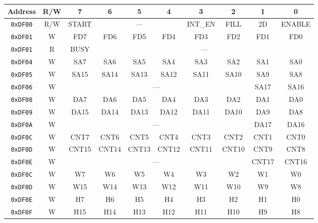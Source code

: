 \begin{table}[h]
    \begin{center}
        \begin{tabular}{|c|c|c|c|c|c|c|c|c|c|} \hline
            Address & R/W & 7 & 6 & 5 & 4 & 3 & 2 & 1 & 0 \\\hline\hline
            \verb+0xDF00+ & R/W & START & \multicolumn{3}{|c|}{---} & INT\_EN & FILL & 2D & ENABLE \\ \hline
            \verb+0xDF01+ & W & FD7 & FD6 & FD5 & FD4 & FD3 & FD2 & FD1 & FD0 \\ \hline
            \verb+0xDF01+ & R & BUSY & \multicolumn{7}{|c|}{---}  \\ \hline\hline

            \verb+0xDF04+ & W & SA7 & SA6 & SA5 & SA4 & SA3 & SA2 & SA1 & SA0 \\ \hline
            \verb+0xDF05+ & W & SA15 & SA14 & SA13 & SA12 & SA11 & SA10 & SA9 & SA8 \\ \hline
            \verb+0xDF06+ & W & \multicolumn{6}{|c|}{---} & SA17 & SA16 \\ \hline\hline

            \verb+0xDF08+ & W & DA7 & DA6 & DA5 & DA4 & DA3 & DA2 & DA1 & DA0 \\ \hline
            \verb+0xDF09+ & W & DA15 & DA14 & DA13 & DA12 & DA11 & DA10 & DA9 & DA8 \\ \hline
            \verb+0xDF0A+ & W & \multicolumn{6}{|c|}{---} & DA17 & DA16 \\ \hline\hline

            \verb+0xDF0C+ & W & CNT7 & CNT6 & CNT5 & CNT4 & CNT3 & CNT2 & CNT1 & CNT0 \\ \hline
            \verb+0xDF0D+ & W & CNT15 & CNT14 & CNT13 & CNT12 & CNT11 & CNT10 & CNT9 & CNT8 \\ \hline
            \verb+0xDF0E+ & W & \multicolumn{6}{|c|}{---} & CNT17 & CNT16 \\ \hline\hline

            \verb+0xDF0C+ & W & W7 & W6 & W5 & W4 & W3 & W2 & W1 & W0 \\ \hline
            \verb+0xDF0D+ & W & W15 & W14 & W13 & W12 & W11 & W10 & W9 & W8 \\ \hline
            \verb+0xDF0E+ & W & H7 & H6 & H5 & H4 & H3 & H2 & H1 & H0 \\ \hline
            \verb+0xDF0F+ & W & H15 & H14 & H13 & H12 & H11 & H10 & H9 & H8 \\ \hline\hline


\end{tabular}
\end{center}
\end{table}
